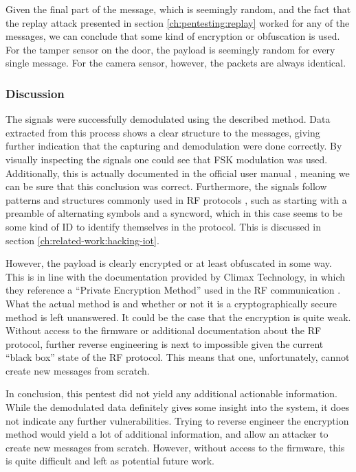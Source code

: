 Given the final part of the message, which is seemingly random, and the fact that the replay attack presented in section \ref{ch:pentesting:replay} worked for any of the messages, we can conclude that some kind of encryption or obfuscation is used. For the tamper sensor on the door, the payload is seemingly random for every single message. For the camera sensor, however, the packets are always identical.

\subsubsection{Discussion}
The signals were successfully demodulated using the described method. Data extracted from this process shows a clear structure to the messages, giving further indication that the capturing and demodulation were done correctly. By visually inspecting the signals one could see that FSK modulation was used. Additionally, this is actually documented in the official user manual \cite{hsgw-user-manual}, meaning we can be sure that this conclusion was correct. Furthermore, the signals follow patterns and structures commonly used in RF protocols \cite{hacking-the-iot-talk}, such as starting with a preamble of alternating symbols and a syncword, which in this case seems to be some kind of ID to identify themselves in the protocol. This is discussed in section \ref{ch:related-work:hacking-iot}.

However, the payload is clearly encrypted or at least obfuscated in some way. This is in line with the documentation provided by Climax Technology, in which they reference a \enquote{Private Encryption Method} used in the RF communication \cite{hsgw-user-manual}. What the actual method is and whether or not it is a cryptographically secure method is left unanswered. It could be the case that the encryption is quite weak. Without access to the firmware or additional documentation about the RF protocol, further reverse engineering is next to impossible given the current \enquote{black box} state of the RF protocol. This means that one, unfortunately, cannot create new messages from scratch.

In conclusion, this pentest did not yield any additional actionable information. While the demodulated data definitely gives some insight into the system, it does not indicate any further vulnerabilities. Trying to reverse engineer the encryption method would yield a lot of additional information, and allow an attacker to create new messages from scratch. However, without access to the firmware, this is quite difficult and left as potential future work.
